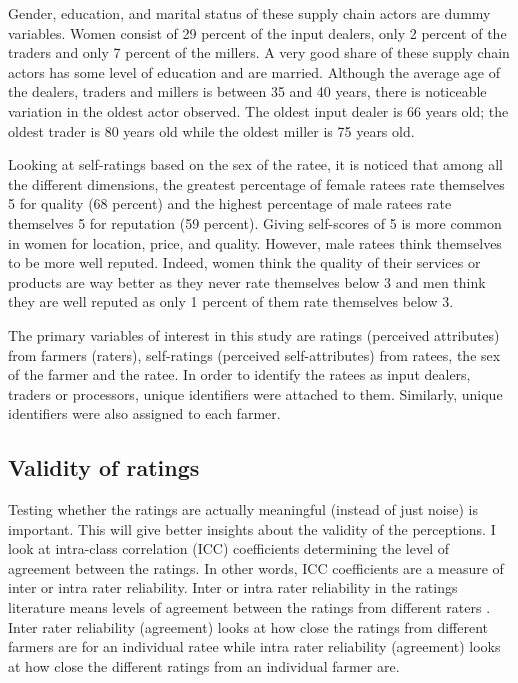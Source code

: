 \documentclass[12pt,english]{article}\usepackage[]{graphicx}\usepackage[]{color}
\begin{document}
Gender, education, and marital status of these supply chain actors
are dummy variables. Women consist of 29
percent of the input dealers, only 2
percent of the traders and only 7
percent of the millers. A very good share of these supply chain actors
has some level of education and are married. Although the average
age of the dealers, traders and millers is between 35 and 40 years,
there is noticeable variation in the oldest actor observed. The oldest
input dealer is 66
years old; the oldest trader is 80
years old while the oldest miller is 75
years old. 

Looking at self-ratings based on the sex of the ratee, it is noticed
that among all the different dimensions, the greatest percentage of
female ratees rate themselves 5 for quality (68
percent) and the highest percentage of male ratees rate themselves
5 for reputation (59
percent). Giving self-scores of 5 is more common in women for location,
price, and quality. However, male ratees think themselves to be more
well reputed. Indeed, women think the quality of their services or
products are way better as they never rate themselves below 3 and
men think they are well reputed as only 1
percent of them rate themselves below 3. 

\begin{onehalfspace}
The primary variables of interest in this study are ratings (perceived
attributes) from farmers (raters), self-ratings (perceived self-attributes)
from ratees, the sex of the farmer and the ratee. In order to identify
the ratees as input dealers, traders or processors, unique identifiers
were attached to them. Similarly, unique identifiers were also assigned
to each farmer. 
\end{onehalfspace}
\begin{onehalfspace}

\subsection{Validity of ratings\label{subsec:Validity-of-ratings}}
\end{onehalfspace}

Testing whether the ratings are actually meaningful (instead of just
noise) is important. This will give better insights about the validity
of the perceptions. I look at intra-class correlation (ICC)\textbf{
}coefficients determining the level of agreement between the ratings.
In other words, ICC coefficients are a measure of inter or intra rater
reliability. Inter or intra rater reliability in the ratings literature
means levels of agreement between the ratings from different raters
\citep{gwet2014handbook}. Inter rater reliability (agreement) looks
at how close the ratings from different farmers are for an individual
ratee while intra rater reliability (agreement) looks at how close
the different ratings from an individual farmer are. 
\end{document}
